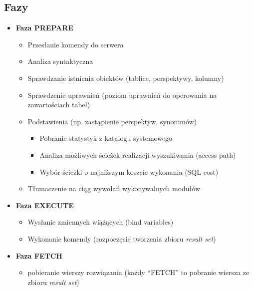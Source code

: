 \documentclass[a4paper,twoside]{article}
\begin{document}
  	\subsection*{Fazy}
  	\begin{itemize}
  		\item \textbf{Faza PREPARE}		%
  		\begin{itemize}
  			\item Przesłanie komendy do serwera
  			\item Analiza syntaktyczna
  			\item Sprawdzanie istnienia obiektów (tablice, perspektywy, kolumny)
  			\item Sprawdzenie uprawnień (poziom uprawnień do operowania na zawartościach tabel)
  			\item Podstawienia (np. zastąpienie perspektyw, synonimów)
  			\begin{itemize}
  				\item Pobranie statystyk z katalogu systemowego
  				\item Analiza możliwych ścieżek realizacji wyszukiwania (access path)
  				\item Wybór ścieżki o najniższym koszcie wykonania (SQL cost)
  			\end{itemize}
  			\item Tłumaczenie na ciąg wywołań wykonywalnych modułów
  		\end{itemize}
  		\item \textbf{Faza EXECUTE}		%
  		\begin{itemize}
  			\item Wysłanie zmiennych wiążących (bind variables)
  			\item Wykonanie komendy (rozpoczęcie tworzenia zbioru \emph{result set})
  		\end{itemize}
  		\item \textbf{Faza FETCH}		%
  		\begin{itemize}
  			\item pobieranie wierszy rozwiązania (każdy “FETCH” to pobranie wiersza ze zbioru \emph{result set})
  		\end{itemize}
  	\end{itemize}
\end{document}
